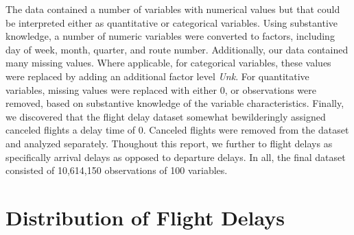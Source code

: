\documentclass[12pt, a4paper]{book}
\newcommand\tab[1][1cm]{\hspace*{#1}}
\begin{document}
	\tab The data contained a number of variables with numerical values but that could be interpreted either as quantitative or categorical variables. Using substantive knowledge, a number of numeric variables were converted to factors, including day of week, month, quarter, and route number. Additionally, our data contained many missing values. Where applicable, for categorical variables, these values were replaced by adding an additional factor level \textit{Unk}. For quantitative variables, missing values were replaced with either 0, or observations were removed, based on substantive knowledge of the variable characteristics. Finally, we discovered that the flight delay dataset somewhat bewilderingly assigned canceled flights a delay time of 0. Canceled flights were removed from the dataset and analyzed separately. Thoughout this report, we further to flight delays as specifically arrival delays as opposed to departure delays. In all, the final dataset consisted of 10,614,150 observations of 100 variables. 
	
	\section{Distribution of Flight Delays}
	
\end{document}
